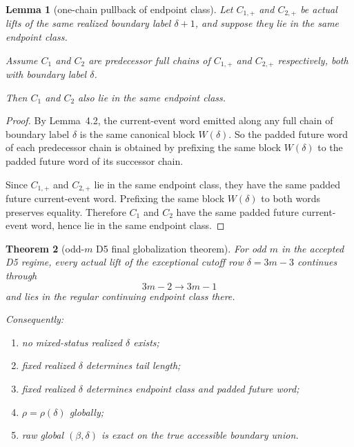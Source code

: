 \documentclass[11pt]{article}
\newtheorem{theorem}{Theorem}[section]
\newtheorem{lemma}[theorem]{Lemma}
\begin{document}
\begin{lemma}[one-chain pullback of endpoint class]
Let $C_{1,+}$ and $C_{2,+}$ be actual lifts of the same realized boundary label
$\delta+1$, and suppose they lie in the same endpoint class.

Assume $C_1$ and $C_2$ are predecessor full chains of $C_{1,+}$ and $C_{2,+}$
respectively, both with boundary label $\delta$.

Then $C_1$ and $C_2$ also lie in the same endpoint class.
\end{lemma}

\begin{proof}
By Lemma~4.2, the current-event word emitted along any full chain of boundary
label $\delta$ is the same canonical block $W(\delta)$. So the padded future
word of each predecessor chain is obtained by prefixing the same block
$W(\delta)$ to the padded future word of its successor chain.

Since $C_{1,+}$ and $C_{2,+}$ lie in the same endpoint class, they have the
same padded future current-event word. Prefixing the same block $W(\delta)$ to
both words preserves equality. Therefore $C_1$ and $C_2$ have the same padded
future current-event word, hence lie in the same endpoint class.
\end{proof}

\begin{theorem}[odd-$m$ D5 final globalization theorem]
For odd $m$ in the accepted D5 regime, every actual lift of the exceptional
cutoff row $\delta=3m-3$ continues through
\[
3m-2 \to 3m-1
\]
and lies in the regular continuing endpoint class there.

Consequently:
\begin{enumerate}[label=\textup{(\arabic*)},leftmargin=2.5em]
\item no mixed-status realized $\delta$ exists;
\item fixed realized $\delta$ determines tail length;
\item fixed realized $\delta$ determines endpoint class and padded future word;
\item $\rho=\rho(\delta)$ globally;
\item raw global $(\beta,\delta)$ is exact on the true accessible boundary
      union.
\end{enumerate}
\end{theorem}
\end{document}
